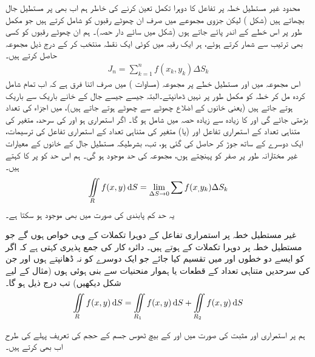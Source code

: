 محدود غیر مستطیل خطہ پر تفاعل   کا دوہرا تکمل تعین کرنے کی خاطر  ہم اب بھی  پر مستطیل جال بچھاتے ہیں (شکل )    لیکن جزوی مجموعے  میں صرف ان چھوٹے رقبوں  کو شامل کرتے ہیں جو مکمل طور پر اس خطے کے اندر  پائے جاتے ہوں (شکل میں  سائے دار  حصہ)۔ ہم ان چھوٹے رقبوں کو کسی بھی  ترتیب سے شمار کرتے  ہوئے، ہر ایک  رقبہ  میں کوئی  ایک نقطہ  منتخب کر کے   درج ذیل مجموعہ حاصل کرتے ہیں۔
\begin{align*}
J_n=\sum_{k=1}^n f(x_k,y_k)\Delta S_k
\end{align*}
اس مجموعہ میں اور مستطیل خطے  پر مجموعہ (مساوات )  میں صرف اتنا فرق ہے کہ  اب تمام  شامل کردہ  مل کر خطہ  کو  مکمل طور پر نہیں ڈھانپتے۔البتہ جیسے جیسے جال کے خانے  باریک سے باریک     ہوتے جاتے ہیں (یعنی خانوں کے اضلاع چھوٹے سے چھوٹے ہوتے جاتے ہیں)،   میں  اجزاء کی تعداد بڑھتی جائے گی  اور  کا زیادہ سے زیادہ حصہ   میں شامل ہو گا۔ اگر  استمراری ہو اور  کی سرحد،     متغیر  کی  متناہی تعداد کے  استمراری تفاعل اور (یا) متغیر  کی  متناہی تعداد کے استمراری تفاعل کی ترسیمات،  ایک دوسرے کے ساتھ جوڑ کر حاصل کی گئی ہو، تب، بشرطیکہ  مستطیل جال کے خانوں کے   معیارات   غیر  مختارانہ  طور پر صفر کو پہنچتے ہوں،  مجموعہ  کی حد موجود  ہو گی۔ ہم اس حد کو  پر  کا  کہتے ہیں۔
\begin{align*}
\iint\limits_R f(x,y)\dif S=\lim_{\Delta S\to 0}\sum f(x_,y_k)\Delta S_k
\end{align*}
یہ حد کم  پابندی کی صورت میں بھی موجود ہو سکتا ہے۔

غیر مستطیل خطہ پر استمراری  تفاعل کے دوہرا تکملات کے وہی خواص ہوں گے جو مستطیل خطہ پر  دوہرا تکملات کے ہوتے ہیں۔ دائرہ کار کی   جمع پذیری  کہتی ہے کہ اگر  کو ایسے   دو  خطوں   اور  میں تقسیم کیا جائے جو ایک دوسرے کو نہ ڈھانپتے   ہوں  اور  جن کی سرحدیں  متناہی تعداد کے قطعات یا ہموار منحنیات  سے بنی ہوئی  ہوں (مثال کے لیے  شکل  دیکھیں)        تب  درج ذیل ہو گا۔
\begin{align*}
\iint\limits_R f(x,y)\dif S=\iint\limits_{R_1}f(x,y)\dif S+\iint\limits_{R_2}f(x,y)\dif S
\end{align*}

ہم   پر استمراری اور مثبت   کی صورت میں   اور  کے بیچ ٹھوس جسم کے حجم  کی تعریف پہلے کی طرح اب بھی    کرتے ہیں۔

